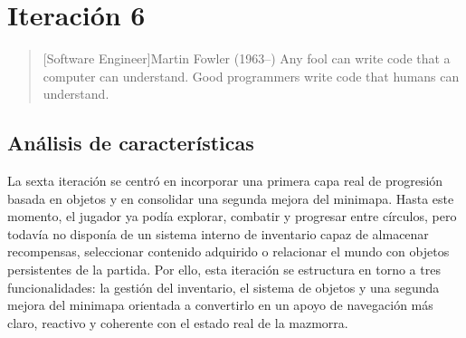 \chapter{Iteración 6}

\begin{quotation}[Software Engineer]{Martin Fowler (1963--)}
Any fool can write code that a computer can understand. Good programmers write code that humans can understand.
\end{quotation}

\begin{abstract}
Esta iteración introduce sistemas de soporte que amplían la profundidad de la partida. El
trabajo se centra en la gestión del inventario, la incorporación de objetos interactivos y
la evolución del minimapa, preparando una experiencia más completa y mejor estructurada.
\end{abstract}

\section{Análisis de características}
La sexta iteración se centró en incorporar una primera capa real de progresión basada en
objetos y en consolidar una segunda mejora del minimapa. Hasta este momento, el jugador ya
podía explorar, combatir y progresar entre círculos, pero todavía no disponía de un sistema
interno de inventario capaz de almacenar recompensas, seleccionar contenido adquirido o
relacionar el mundo con objetos persistentes de la partida. Por ello, esta iteración se
estructura en torno a tres funcionalidades: la gestión del inventario, el sistema de objetos
y una segunda mejora del minimapa orientada a convertirlo en un apoyo de navegación más claro,
reactivo y coherente con el estado real de la mazmorra.

